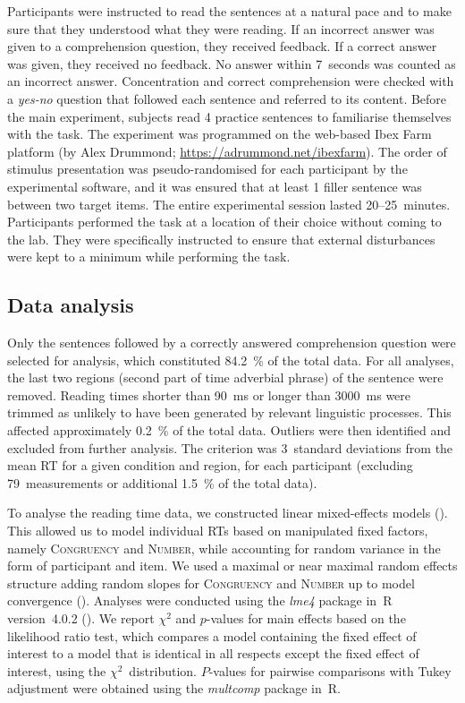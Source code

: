 \documentclass[output=paper,colorlinks,citecolor=brown]{langscibook}
\begin{document}
Participants were instructed to read the sentences at a natural pace and to make sure that they understood what they were reading. If an incorrect answer was given to a comprehension question, they received feedback. If a correct answer was given, they received no feedback. No answer within 7~seconds was counted as an incorrect answer. Concentration and correct comprehension were checked with a \textit{yes-no} question that followed each sentence and referred to its content. Before the main experiment, subjects read 4 practice sentences to familiarise themselves with the task. The experiment was programmed on the web-based Ibex Farm platform (by Alex Drummond; \url{https://adrummond.net/ibexfarm}). The order of stimulus presentation was pseudo-randomised for each participant by the experimental software, and it was ensured that at least 1 filler sentence was between two target items. The entire experimental session lasted 20--25~minutes. Participants performed the task at a location of their choice without coming to the lab. They were specifically instructed to ensure that external disturbances were kept to a minimum while performing the task.

\subsection{Data analysis}\label{ste-pav:sec:data-analysis}

Only the sentences followed by a correctly answered comprehension question were selected for analysis, which constituted \qty{84.2}{\percent} of the total data. For all analyses, the last two regions (second part of time adverbial phrase) of the sentence were removed. Reading times shorter than \qty{90}{ms} or longer than \qty{3000}{ms} were trimmed as unlikely to have been generated by relevant linguistic processes. This affected approximately \qty{0.2}{\percent} of the total data. Outliers were then identified and excluded from further analysis. The criterion was 3~standard deviations from the mean RT for a given condition and region, for each participant (excluding 79~measurements or additional \qty{1.5}{\percent} of the total data).

To analyse the reading time data, we constructed linear mixed-effects models (\citealt{bates2015}). This allowed us to model individual RTs based on manipulated fixed factors, namely \textsc{Congruency} and \textsc{Number}, while accounting for random variance in the form of participant and item. We used a maximal or near maximal random effects structure adding random slopes for \textsc{Congruency} and \textsc{Number} up to model convergence (\citealt{matuschek2017}). Analyses were conducted using the \textit{lme4} package in~R version~4.0.2 (\citealt{teamR2020}). We report $\chi^2$ and $p$-values for main effects based on the likelihood ratio test, which compares a model containing the fixed effect of interest to a model that is identical in all respects except the fixed effect of interest, using the $\chi^2$~distribution. $P$-values for pairwise comparisons with Tukey adjustment were obtained using the \textit{multcomp} package in~R.
\end{document}
